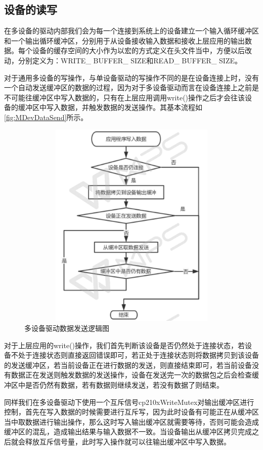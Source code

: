 \subsection{设备的读写}
	
	在多设备的驱动内部我们会为每一个连接到系统上的设备建立一个输入循环缓冲区和一个输出循环缓冲区，分别用于从设备接收输入数据和接收上层应用的输出数据。每个设备的缓存空间的大小作为以宏的方式定义在头文件当中，方便以后改动，分别定义为：WRITE\_ BUFFER\_ SIZE和READ\_ BUFFER\_ SIZE。
		
	对于通用多设备的写操作，与单设备驱动的写操作不同的是在设备连接上时，没有一个自动发送缓冲区的数据的过程，因为对于多设备驱动而言在设备连接上之前是不可能往缓冲区中写入数据的，只有在上层应用调用write()操作之后才会往该设备的缓冲区中写入数据，并触发数据的发送操作。其基本流程如\autoref{fig:MDevDataSend}所示。

\begin{figure}[!h]
\centering
\includegraphics[width=13cm , height=10cm]{./graphics/MDevDataSend.pdf}
\caption{多设备驱动数据发送逻辑图}\label{fig:MDevDataSend}
\end{figure}

对于上层应用的write()操作，我们首先判断该设备是否仍然处于连接状态，若设备不处于连接状态则直接返回错误即可，若正处于连接状态则将数据拷贝到该设备的发送缓冲区，若当前设备正在进行数据的发送，则直接结束即可，若当前设备没有数据正在发送则触发数据的发送操作，设备在发送完一次的数据包之后会检查缓冲区中是否仍然有数据，若有数据则继续发送，若没有数据了则结束。
	
	
	同样我们在多设备驱动下使用一个互斥信号cp210xWriteMutex对输出缓冲区进行控制，首先在写入数据的时候需要进行互斥写，因为此时设备有可能正在从缓冲区当中取数据进行输出操作，那么这时写入输出缓冲区就需要等待，否则可能会造成缓冲区的混乱，造成输出结果与输入数据不一致。当设备输出从缓冲区拷贝完成之后就会释放互斥信号量，此时写入操作就可以往输出缓冲区中写入数据。


